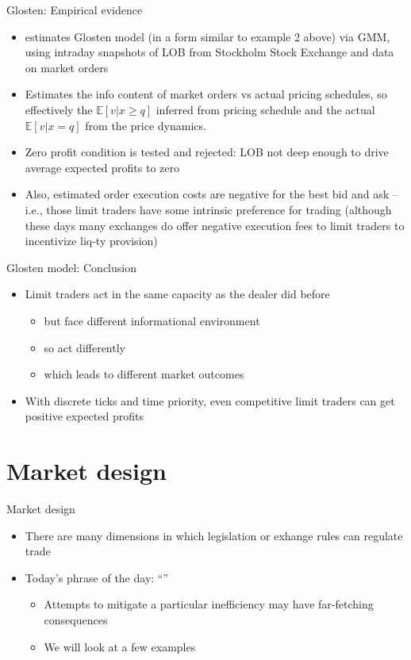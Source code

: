 \documentclass[english,10pt
,aspectratio=169
]{beamer}
\begin{document}
\begin{frame}{Glosten: Empirical evidence}
	\begin{itemize}
		\item \textbf{\cite{sandas_adverse_2001}} estimates Glosten model (in a form similar to example 2 above) via GMM, using intraday snapshots of LOB from Stockholm Stock Exchange and data on market orders 
		\item Estimates the info content of market orders vs actual pricing schedules, so effectively the $\mathbb{E}[v|x \geq q]$ inferred from pricing schedule and the actual $\mathbb{E}[v|x = q]$ from the price dynamics.
		\item Zero profit condition is tested and rejected: LOB not deep enough to drive average expected profits to zero
		\item Also, estimated order execution costs are negative for the best bid and ask -- i.e., those limit traders have some intrinsic preference for trading (although these days many exchanges do offer negative execution fees to limit traders to incentivize liq-ty provision)
	\end{itemize}
\end{frame}


\begin{frame}{Glosten model: Conclusion}
\begin{itemize}
	\item Limit traders act in the same capacity as the dealer did before
	\begin{itemize}
		\item but face different \alert{informational environment}
		\item so act differently
		\item which leads to different market outcomes
	\end{itemize}
	\item With discrete ticks and time priority, even competitive limit traders can get positive expected profits
\end{itemize}
\end{frame}




\section{Market design}

\begin{frame}{Market design}
	\begin{itemize}
		\item There are many dimensions in which legislation or exhange rules can regulate trade
		\item Today's phrase of the day: ``''
		\begin{itemize}
			\item Attempts to mitigate a particular inefficiency may have far-fetching consequences
			\item We will look at a few examples
		\end{itemize}
	\end{itemize}
\end{frame}
\end{document}
